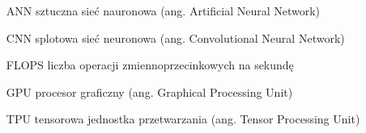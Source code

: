 \flushleft



\begin{itemize}[noitemsep,topsep=0pt,parsep=0pt,partopsep=0pt,labelwidth=3cm,align=left,itemindent=3cm]
\item[ANN] sztuczna sieć nauronowa (ang. Artificial Neural Network)
    \item[CNN] splotowa sieć neuronowa (ang. Convolutional Neural Network)
    \item[FLOPS] liczba operacji zmiennoprzecinkowych na sekundę
    \item[GPU] procesor graficzny (ang. Graphical Processing Unit)
    \item[TPU] tensorowa jednostka przetwarzania (ang. Tensor Processing Unit)
\end{itemize}

